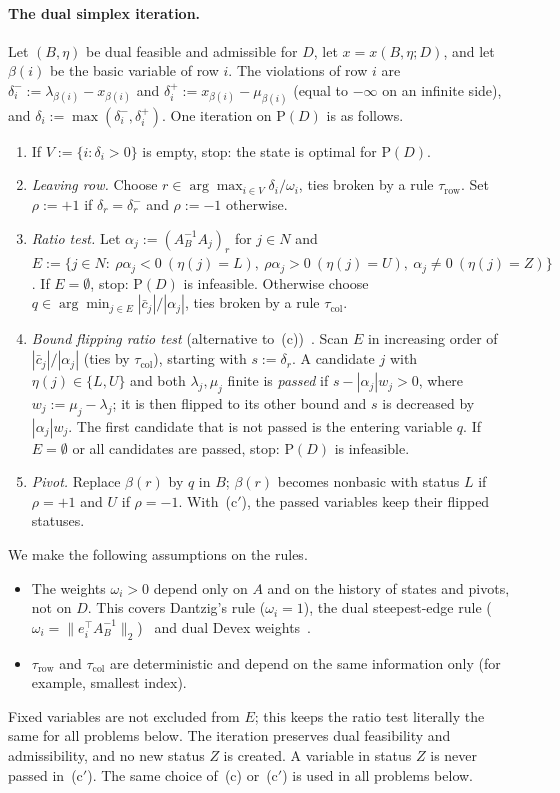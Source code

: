\documentclass[11pt,a4paper]{article}
\theoremstyle{plain}
\theoremstyle{definition}
\theoremstyle{remark}
\newcommand{\Pb}{\mathrm{P}}
\begin{document}
\paragraph{The dual simplex iteration.}
Let $(B,\eta)$ be dual feasible and admissible for $D$, let $x=x(B,\eta;D)$, and let $\beta(i)$ be the basic variable of row $i$. The violations of row $i$ are
$\delta_i^-:=\lambda_{\beta(i)}-x_{\beta(i)}$ and $\delta_i^+:=x_{\beta(i)}-\mu_{\beta(i)}$ (equal to $-\infty$ on an infinite side), and $\delta_i:=\max(\delta_i^-,\delta_i^+)$. One iteration on $\Pb(D)$ is as follows.
\begin{enumerate}[label=(\alph*)]
\item If $V:=\{i:\delta_i>0\}$ is empty, stop: the state is optimal for $\Pb(D)$.
\item \emph{Leaving row.} Choose $r\in\arg\max_{i\in V}\delta_i/\omega_i$, ties broken by a rule $\tau_{\mathrm{row}}$. Set $\rho:=+1$ if $\delta_r=\delta_r^-$ and $\rho:=-1$ otherwise.
\item \emph{Ratio test.} Let $\alpha_j:=(A_B^{-1}A_j)_r$ for $j\in N$ and
$E:=\{j\in N:\ \rho\alpha_j<0\ (\eta(j)=L),\ \rho\alpha_j>0\ (\eta(j)=U),\ \alpha_j\neq0\ (\eta(j)=Z)\}$.
If $E=\emptyset$, stop: $\Pb(D)$ is infeasible. Otherwise choose $q\in\arg\min_{j\in E}|\bar c_j|/|\alpha_j|$, ties broken by a rule $\tau_{\mathrm{col}}$.
\item[(c$'$)] \emph{Bound flipping ratio test} (alternative to~(c))~\cite{kostina2002,maros2003pl,koberstein2005}. Scan $E$ in increasing order of $|\bar c_j|/|\alpha_j|$ (ties by $\tau_{\mathrm{col}}$), starting with $s:=\delta_r$. A candidate $j$ with $\eta(j)\in\{L,U\}$ and both $\lambda_j,\mu_j$ finite is \emph{passed} if $s-|\alpha_j|w_j>0$, where $w_j:=\mu_j-\lambda_j$; it is then flipped to its other bound and $s$ is decreased by $|\alpha_j|w_j$. The first candidate that is not passed is the entering variable $q$. If $E=\emptyset$ or all candidates are passed, stop: $\Pb(D)$ is infeasible.
\item \emph{Pivot.} Replace $\beta(r)$ by $q$ in $B$; $\beta(r)$ becomes nonbasic with status $L$ if $\rho=+1$ and $U$ if $\rho=-1$. With~(c$'$), the passed variables keep their flipped statuses.
\end{enumerate}
We make the following assumptions on the rules.
\begin{itemize}
\item The weights $\omega_i>0$ depend only on $A$ and on the history of states and pivots, not on $D$. This covers Dantzig's rule ($\omega_i=1$), the dual steepest-edge rule ($\omega_i=\|e_i^\top A_B^{-1}\|_2$)~\cite{forrestgoldfarb1992} and dual Devex weights~\cite{harris1973}.
\item $\tau_{\mathrm{row}}$ and $\tau_{\mathrm{col}}$ are deterministic and depend on the same information only (for example, smallest index).
\end{itemize}
Fixed variables are not excluded from $E$; this keeps the ratio test literally the same for all problems below. The iteration preserves dual feasibility and admissibility, and no new status $Z$ is created. A variable in status $Z$ is never passed in~(c$'$). The same choice of~(c) or~(c$'$) is used in all problems below.
\end{document}
